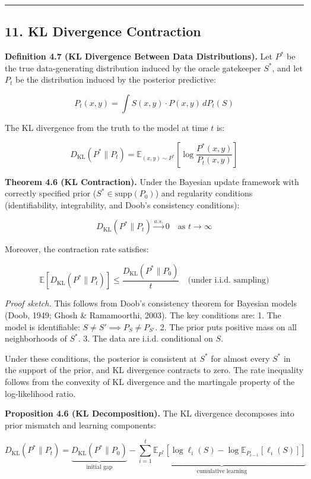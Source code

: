 \documentclass[
  12pt,
]{article}
\begin{document}
\begin{center}\rule{0.5\linewidth}{0.5pt}\end{center}

\subsection{11. KL Divergence
Contraction}\label{kl-divergence-contraction}

\textbf{Definition 4.7 (KL Divergence Between Data Distributions).} Let
\(P^*\) be the true data-generating distribution induced by the oracle
gatekeeper \(S^*\), and let \(P_t\) be the distribution induced by the
posterior predictive:

\[
P_t(x,y) = \int S(x,y) \cdot P(x,y) \, dP_t(S)
\]

The KL divergence from the truth to the model at time \(t\) is:

\[
D_{\text{KL}}(P^* \parallel P_t) = \mathbb{E}_{(x,y) \sim P^*} \left[ \log \frac{P^*(x,y)}{P_t(x,y)} \right]
\]

\textbf{Theorem 4.6 (KL Contraction).} Under the Bayesian update
framework with correctly specified prior (\(S^* \in \text{supp}(P_0)\))
and regularity conditions (identifiability, integrability, and Doob's
consistency conditions):

\[
D_{\text{KL}}(P^* \parallel P_t) \xrightarrow{a.s.} 0 \quad \text{as } t \to \infty
\]

Moreover, the contraction rate satisfies:

\[
\mathbb{E}[D_{\text{KL}}(P^* \parallel P_t)] \leq \frac{D_{\text{KL}}(P^* \parallel P_0)}{t} \quad \text{(under i.i.d. sampling)}
\]

\emph{Proof sketch.} This follows from Doob's consistency theorem for
Bayesian models (Doob, 1949; Ghosh \& Ramamoorthi, 2003). The key
conditions are: 1. The model is identifiable:
\(S \neq S' \implies P_S \neq P_{S'}\). 2. The prior puts positive mass
on all neighborhoods of \(S^*\). 3. The data are i.i.d. conditional on
\(S\).

Under these conditions, the posterior is consistent at \(S^*\) for
almost every \(S^*\) in the support of the prior, and KL divergence
contracts to zero. The rate inequality follows from the convexity of KL
divergence and the martingale property of the log-likelihood ratio.

\textbf{Proposition 4.6 (KL Decomposition).} The KL divergence
decomposes into prior mismatch and learning components:

\[
D_{\text{KL}}(P^* \parallel P_t) = \underbrace{D_{\text{KL}}(P^* \parallel P_0)}_{\text{initial gap}} - \underbrace{\sum_{i=1}^t \mathbb{E}_{P^*}[\log \ell_i(S) - \log \mathbb{E}_{P_{i-1}}[\ell_i(S)]]}_{\text{cumulative learning}}
\]
\end{document}
